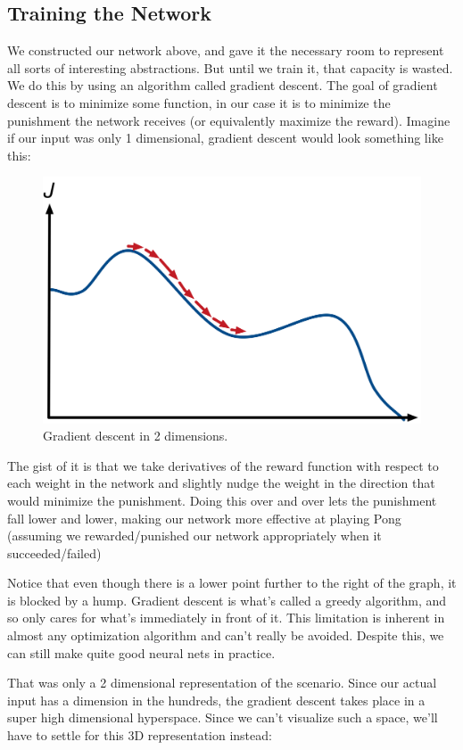 \documentclass{article}
\begin{document}
\subsection{Training the Network}
We constructed our network above, and gave it the necessary room to represent all sorts of interesting abstractions. But until we train it, that capacity is wasted. We do this by using an algorithm called gradient descent. The goal of gradient descent is to minimize some function, in our case it is to minimize the punishment the network receives (or equivalently maximize the reward). Imagine if our input was only 1 dimensional, gradient descent would look something like this:

\begin{figure}[H]
\centering
\includegraphics[width=.5\linewidth]{2d}
\caption*{Gradient descent in 2 dimensions.}
\end{figure}

The gist of it is that we take derivatives of the reward function with respect to each weight in the network and slightly nudge the weight in the direction that would minimize the punishment. Doing this over and over lets the punishment fall lower and lower, making our network more effective at playing Pong (assuming we rewarded/punished our network appropriately when it succeeded/failed)

Notice that even though there is a lower point further to the right of the graph, it is blocked by a hump. Gradient descent is what's called a greedy algorithm, and so only cares for what's immediately in front of it. This limitation is inherent in almost any optimization algorithm and can't really be avoided. Despite this, we can still make quite good neural nets in practice.

That was only a 2 dimensional representation of the scenario. Since our actual input has a dimension in the hundreds, the gradient descent takes place in a super high dimensional hyperspace. Since we can't visualize such a space, we'll have to settle for this 3D representation instead:
\end{document}
